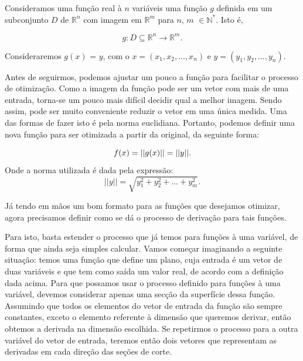 \begin{definition}
    Consideramos uma função real à $n$ variáveis uma função $g$ definida em um
    subconjunto $D$ de \(\mathbb{R}^n\) com imagem em \(\mathbb{R}^m\) para
    $n$, $m$ \(\in \mathbb{N^*}\). Isto é,

    \begin{equation}
            g: D \subseteq \mathbb{R}^n \rightarrow \mathbb{R}^m.
    \end{equation}

    Consideraremos $g(x)$ = $y$, com o $x=(x_1, x_2, ..., x_n)$
    e $y=(y_1, y_2, ..., y_n)$.

\end{definition}



Antes de seguirmos, podemos ajustar um pouco a função para facilitar o processo
de otimização. Como a imagem da função pode ser um vetor com mais de uma
entrada, torna-se um pouco mais difícil decidir qual a melhor imagem. Sendo
assim, pode ser muito conveniente reduzir o vetor em uma única medida. Uma das
formas de fazer isto é pela norma euclidiana. Portanto, podemos definir uma
nova função para ser otimizada a partir da original, da seguinte forma:


\begin{equation}
        f(x) = ||g(x)|| = ||y||.\\
\end{equation}
        Onde a norma utilizada é dada pela expressão:
\begin{equation}
        ||y|| = \sqrt{ y_1^2 + y_2^2 + \hdots + y_m^2}.
\end{equation}

Já tendo em mãos um bom formato para as funções que desejamos otimizar, agora
precisamos definir como se dá o processo de derivação para tais funções.

Para isto, basta estender o processo que já temos para funções à uma variável,
de forma que ainda seja simples calcular. Vamos começar imaginando a seguinte
situação: temos uma função que define um plano, cuja entrada é um vetor de
duas variáveis e que tem como saída um valor real, de acordo com a definição
dada acima. Para que possamos usar o processo definido para funções à uma
variável, devemos considerar apenas uma secção da superfície dessa função.
Assumindo que todos os elementos do vetor de entrada da função são sempre
constantes, exceto o elemento referente à dimensão que queremos derivar, então
obtemos a derivada na dimensão escolhida. Se repetirmos o processo para a outra
variável do vetor de entrada, teremos então dois vetores que representam as
derivadas em cada direção das seções de corte.


